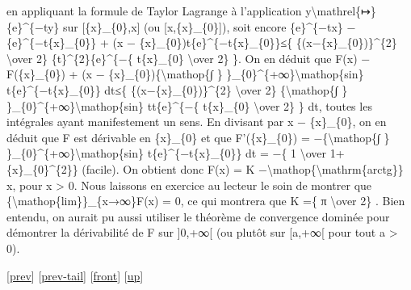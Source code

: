 \documentclass[]{article}
\begin{document}
en appliquant la formule de Taylor Lagrange à l'application
y\textbackslash{}mathrel\{↦\}\{e\}\^{}\{−ty\} sur {[}\{x\}\_\{0\},x{]}
(ou {[}x,\{x\}\_\{0\}{]}), soit encore \textbar{}\{e\}\^{}\{−tx\} −
\{e\}\^{}\{−t\{x\}\_\{0\}\} + (x −
\{x\}\_\{0\})t\{e\}\^{}\{−t\{x\}\_\{0\}\}\textbar{}≤\{
\{(x−\{x\}\_\{0\})\}\^{}\{2\} \textbackslash{}over 2\}
\{t\}\^{}\{2\}\{e\}\^{}\{−\{ t\{x\}\_\{0\} \textbackslash{}over 2\} \}.
On en déduit que \textbar{}F(x) − F(\{x\}\_\{0\}) + (x −
\{x\}\_\{0\})\{\textbackslash{}mathop\{∫ \}
\}\_\{0\}\^{}\{+∞\}\textbackslash{}mathop\{sin\}
t\{e\}\^{}\{−t\{x\}\_\{0\}\} dt\textbar{}≤\{
\{(x−\{x\}\_\{0\})\}\^{}\{2\} \textbackslash{}over 2\}
\{\textbackslash{}mathop\{∫ \}
\}\_\{0\}\^{}\{+∞\}\textbar{}\textbackslash{}mathop\{sin\}
t\textbar{}t\{e\}\^{}\{−\{ t\{x\}\_\{0\} \textbackslash{}over 2\} \} dt,
toutes les intégrales ayant manifestement un sens. En divisant par
\textbar{}x − \{x\}\_\{0\}\textbar{}, on en déduit que F est dérivable
en \{x\}\_\{0\} et que F'(\{x\}\_\{0\}) = −\{\textbackslash{}mathop\{∫
\} \}\_\{0\}\^{}\{+∞\}\textbackslash{}mathop\{sin\}
t\{e\}\^{}\{−t\{x\}\_\{0\}\} dt = −\{ 1 \textbackslash{}over
1+\{x\}\_\{0\}\^{}\{2\}\} (facile). On obtient donc F(x) = K
−\textbackslash{}mathop\{\textbackslash{}mathrm\{arctg\}\} x, pour x
\textgreater{} 0. Nous laissons en exercice au lecteur le soin de
montrer que \{\textbackslash{}mathop\{lim\}\}\_\{x→∞\}F(x) = 0, ce qui
montrera que K =\{ π \textbackslash{}over 2\} . Bien entendu, on aurait
pu aussi utiliser le théorème de convergence dominée pour démontrer la
dérivabilité de F sur {]}0,+∞{[} (ou plutôt sur {[}a,+∞{[} pour tout a
\textgreater{} 0).

{[}\href{coursse61.html}{prev}{]}
{[}\href{coursse61.html\#tailcoursse61.html}{prev-tail}{]}
{[}\href{coursse62.html}{front}{]}
{[}\href{coursch11.html\#coursse62.html}{up}{]}
\end{document}
